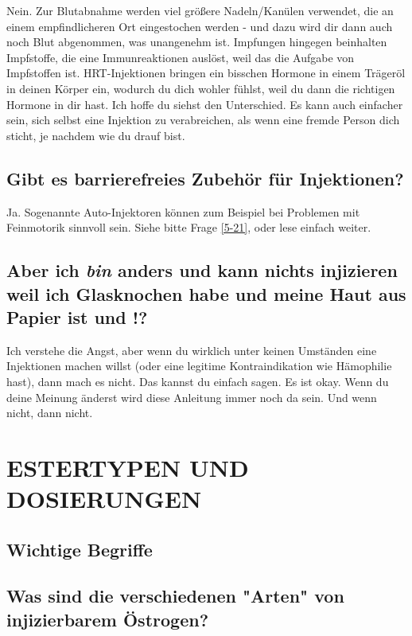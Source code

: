 \documentclass{article}
\begin{document}
Nein. Zur Blutabnahme werden viel größere Nadeln/Kanülen verwendet, die an einem empfindlicheren Ort eingestochen werden - und dazu wird dir dann auch noch Blut abgenommen, was unangenehm ist. Impfungen hingegen beinhalten Impfstoffe, die eine Immunreaktionen auslöst, weil das die Aufgabe von Impfstoffen ist. HRT-Injektionen bringen ein bisschen Hormone in einem Trägeröl in deinen Körper ein, wodurch du dich wohler fühlst, weil du dann die richtigen Hormone in dir hast. Ich hoffe du siehst den Unterschied. Es kann auch einfacher sein, sich selbst eine Injektion zu verabreichen, als wenn eine fremde Person dich sticht, je nachdem wie du drauf bist.

\subsection{Gibt es barrierefreies Zubehör für Injektionen?}

Ja. Sogenannte Auto-Injektoren können zum Beispiel bei Problemen mit Feinmotorik sinnvoll sein. Siehe bitte Frage \ref{5-21}, oder lese einfach weiter.

\subsection{Aber ich \textit{bin} anders und kann nichts injizieren weil ich Glasknochen habe und meine Haut aus Papier ist und \textemdash{}!?}

Ich verstehe die Angst, aber wenn du wirklich unter keinen Umständen eine Injektionen machen willst (oder eine legitime Kontraindikation wie Hämophilie hast), dann mach es nicht. Das kannst du einfach sagen. Es ist okay. Wenn du deine Meinung änderst wird diese Anleitung immer noch da sein. Und wenn nicht, dann nicht.



\section{ESTERTYPEN UND DOSIERUNGEN}\label{td}

\subsection*{Wichtige Begriffe}

\subsection{Was sind die verschiedenen "Arten" von injizierbarem Östrogen?}
\end{document}

